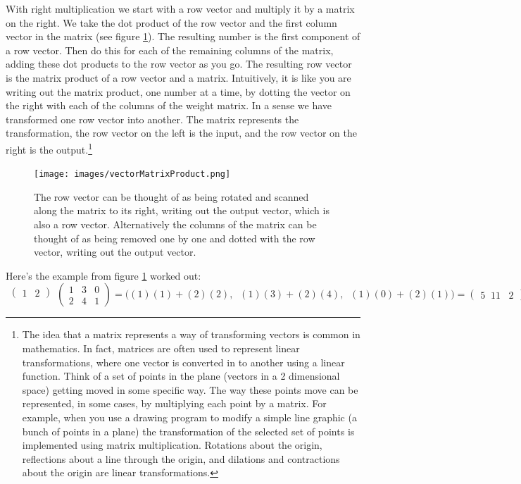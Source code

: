 With right multiplication we start with a row vector and multiply it by a matrix on the right. We take the dot product of the row vector and the first column vector in the matrix (see figure \ref{vectorMatrixProduct}). The resulting number is the first component of a row vector. Then do this for each of the remaining columns of the matrix, adding these dot products to the row vector as you go. The resulting row vector is the matrix product of a row vector and a matrix. Intuitively, it is like you are writing out the matrix product, one number at a time, by dotting the vector on the right with each of the columns of the weight matrix. In a sense we have transformed one row vector into another. The matrix represents the transformation, the row vector on the left is the input, and the row vector on the right is the output.\footnote{The idea that a matrix represents a way of transforming vectors is common in mathematics. In fact, matrices are often used to represent linear transformations, where one vector is converted in to another using a linear function. Think of a set of points in the plane (vectors in a 2 dimensional space) getting moved in some specific way. The way these points move can be represented, in some cases, by multiplying each point by a matrix. For example, when you use a drawing program to modify a simple line graphic (a bunch of points in a plane) the transformation of the selected set of points is implemented using matrix multiplication. Rotations about the origin, reflections about a line through the origin, and dilations and contractions about the origin are linear transformations.}

\begin{figure}[h]
\centering
\texttt{[image: images/vectorMatrixProduct.png]}
\caption[Jeff Yoshimi.]{The row vector can be thought of as being rotated and scanned along the matrix to its right, writing out the output vector, which is also a row vector. Alternatively the columns of the matrix can be thought of as being removed one by one and dotted with the row vector, writing out the output vector.}
\label{vectorMatrixProduct}
\end{figure}

Here's the example from figure \ref{vectorMatrixProduct} worked out:
\[
  \begin{matrix}\begin{pmatrix}1 & 2\end{pmatrix}\\\mbox{}\end{matrix}
  \begin{pmatrix} 1 & 3 & 0 \\ 2 & 4 & 1 \end{pmatrix} 
  =
  \bigg( (1)(1) + (2)(2) ,\;\; (1)(3) + (2)(4) ,\;\; (1)(0)+ (2)(1) \bigg)
  =
  \begin{pmatrix}  5 \;\; 11 \;\;\; 2  \end{pmatrix}
\]
\vspace*{.1cm} 

